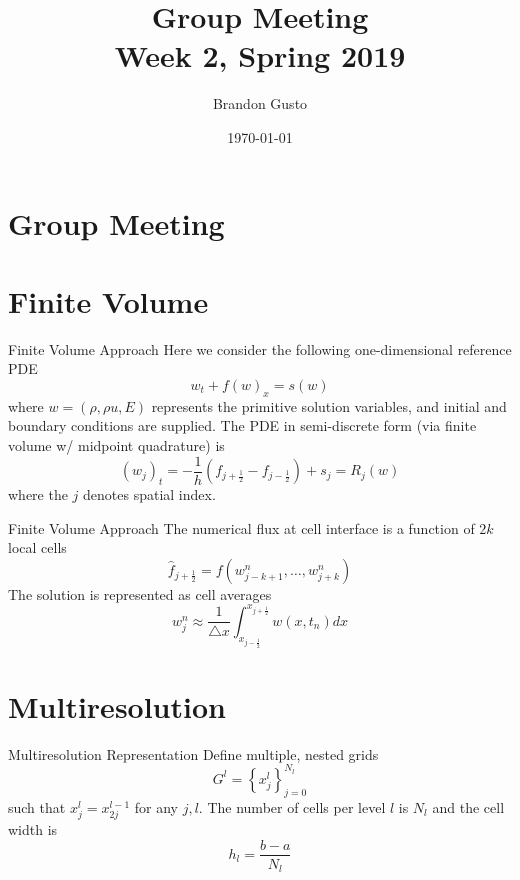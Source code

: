 \documentclass{beamer}
\begin{document}
\section{Group Meeting}
\title{Group Meeting \\ Week 2, Spring 2019}
\author{Brandon Gusto} %
\date{\today}
\frame{\titlepage}

\section{Finite Volume}

\begin{frame}[center]{Finite Volume Approach}
    Here we consider the following one-dimensional reference PDE
    \begin{equation*}
      w_{t} + f(w)_{x} = s(w)
    \end{equation*}
    where $w = (\rho,\rho u,E)$ represents the primitive solution variables, and initial and boundary
    conditions are supplied. The PDE in semi-discrete form (via finite volume w/ midpoint quadrature) is
    \begin{equation*}
          (w_{j})_{t} = -\frac{1}{h} \left( f_{j+\frac{1}{2}} - f_{j-\frac{1}{2}} \right) + s_{j}
                      = R_{j}(w)
    \end{equation*}
    where the $j$ denotes spatial index.
\end{frame}

\begin{frame}[center]{Finite Volume Approach}
    The numerical flux at cell interface is a function of $2k$ local cells
    \begin{equation*}
          \hat{f}_{j+\frac{1}{2}} = f(w^{n}_{j-k+1},\dots,w^{n}_{j+k})
    \end{equation*}
    The solution is represented as cell averages
    \begin{equation*}
          w^{n}_{j} \approx \frac{1}{\triangle x} \int_{x_{j-\frac{1}{2}}}^{x_{j+\frac{1}{2}}} w(x,t_{n}) dx
    \end{equation*}
\end{frame}

\section{Multiresolution}

\begin{frame}[center]{Multiresolution Representation}
    Define multiple, nested grids
    \begin{equation*}
      G^{l} = \left\{ x^{l}_{j} \right\}_{j=0}^{N_{l}}
    \end{equation*}
    such that $x_{j}^{l} = x_{2j}^{l-1}$ for any $j,l$. The number of cells per level $l$ is $N_{l}$
    and the cell width is
    \begin{equation*}
      h_{l} = \frac{b-a}{N_{l}}
    \end{equation*}
\end{frame}
\end{document}
